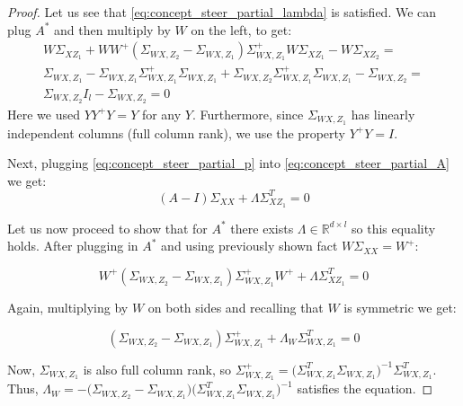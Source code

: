 \begin{proof}
	Let us see that \eqref{eq:concept_steer_partial_lambda} is satisfied. We can plug $A^*$ and then multiply by $W$ on the left, to get:
	\begin{multline*}
		W\Sigma_{XZ_1} + WW^+ (\Sigma_{WX, Z_2} - \Sigma_{WX, Z_1})\Sigma_{WX, Z_1}^+ W \Sigma_{XZ_1} - W \Sigma_{XZ_2} = \\ \Sigma_{WX,Z_1} -  \Sigma_{WX, Z_1} \Sigma_{WX, Z_1}^+ \Sigma_{WX, Z_1} + \Sigma_{WX, Z_2} \Sigma_{WX, Z_1}^+ \Sigma_{WX, Z_1} - \Sigma_{WX, Z_2} = \\
        \Sigma_{WX, Z_2} I_l - \Sigma_{WX, Z_2} = 0
		\tag{almost surely}
	\end{multline*}
    Here we used $YY^+Y = Y$ for any $Y$. Furthermore, since $\Sigma_{WX, Z_1}$ has linearly independent columns (full column rank), we use the property $Y^+Y = I$.
	
	Next, plugging \eqref{eq:concept_steer_partial_p} into \eqref{eq:concept_steer_partial_A} we get:
	\begin{equation}
		\label{eq:concept_steer_partial_A_rewritten}
		(A - I) \Sigma_{XX} + \Lambda \Sigma_{XZ_1}^T = 0
	\end{equation}


    Let us now proceed to show that for $A^*$ there exists $\Lambda \in \mathbb{R}^{d \times l}$ so this equality holds. After plugging in $A^*$ and using previously shown fact $W \Sigma_{XX} = W^+$:

    \begin{equation}
        W^+ (\Sigma_{WX, Z_2} - \Sigma_{WX, Z_1})\Sigma_{WX, Z_1}^+ W^+ + \Lambda \Sigma_{XZ_1}^T = 0
    \end{equation}

    Again, multiplying by $W$ on both sides and recalling that $W$ is symmetric we get:

    \begin{equation}
        (\Sigma_{WX, Z_2} - \Sigma_{WX, Z_1})\Sigma_{WX, Z_1}^+ + \Lambda_W \Sigma_{WX,Z_1}^T = 0
        \tag{almost surely}
    \end{equation}

    Now, $\Sigma_{WX, Z_1}$ is also full column rank, so $\Sigma_{WX, Z_1}^+ = \Big( \Sigma_{WX, Z_1}^T \Sigma_{WX, Z_1} \Big)^{-1} \Sigma_{WX, Z_1}^T$. Thus, $\Lambda_W = - \Big(\Sigma_{WX, Z_2} - \Sigma_{WX, Z_1}\Big) \Big( \Sigma_{WX, Z_1}^T \Sigma_{WX, Z_1} \Big)^{-1}$ satisfies the equation.
	
\end{proof}

